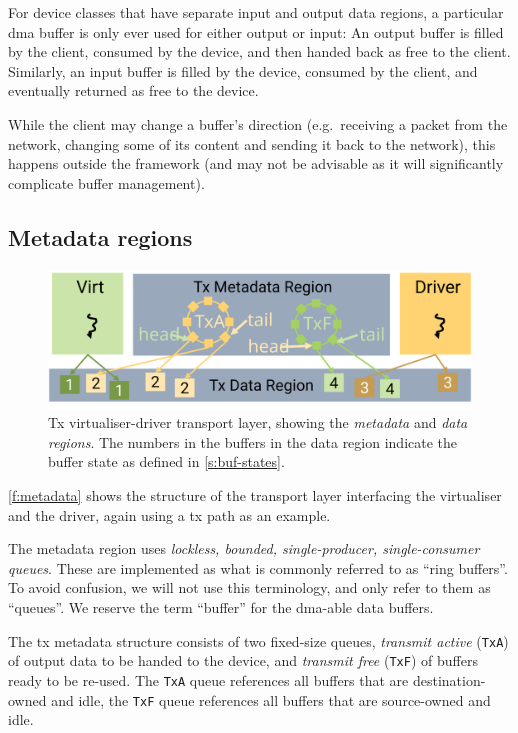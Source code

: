 \documentclass[a4paper,12pt]{report}
\newcommand{\code}[1]{\texttt{#1}}
\newcommand{\Obj}[1]{\textsl{#1}}
\newcommand{\figscale}{0.2}
\begin{document}
For device classes that have separate input and output data regions,
a particular \gls{dma} buffer is only ever used
for either output or input: An output buffer is filled by the client,
consumed by the device, and then handed back as free
to the client.  Similarly, an
input buffer is filled by the device, consumed by the client, and eventually
returned as free to the device.

While the client may change a buffer's direction (e.g.\
receiving a packet from the network, changing some of its content and
sending it back to the network), this happens outside the
framework (and may not be advisable as it will significantly
complicate buffer management).

\subsection{Metadata regions}\label{s:ownership}\label{s:metadata}

\begin{figure}[th]
  \centering
  \includegraphics[scale=\figscale]{metadata}
  \caption[Tx virtualiser-driver transport layer, showing the
  \Obj{metadata} and \Obj{data regions}.]
  {Tx virtualiser-driver transport layer, showing the
    \Obj{metadata} and \Obj{data regions}. The numbers in the
    buffers in the data region indicate the buffer state as defined in
    \autoref{s:buf-states}.}
  \label{f:metadata}
\end{figure}

\autoref{f:metadata} shows the structure of the transport layer
interfacing the virtualiser and the driver, again using a \gls{tx} path as
an example.

The metadata region
uses \emph{lockless, bounded, single-producer, single-consumer queues}.
These are implemented as what is commonly referred to as ``ring
buffers''. To avoid confusion, we will not use this terminology, and
only refer to them as ``queues''. We reserve the term ``buffer'' for the
\gls{dma}-able data buffers.

The \gls{tx} metadata structure consists of two fixed-size queues, \emph{transmit
active} (\code{TxA}) of output data to be handed to the device,
and \emph{transmit free} (\code{TxF}) of buffers ready to be re-used. The \code{TxA} queue
references all buffers that are destination-owned and idle, the \code{TxF}
queue references all buffers that are source-owned and idle.
\end{document}
